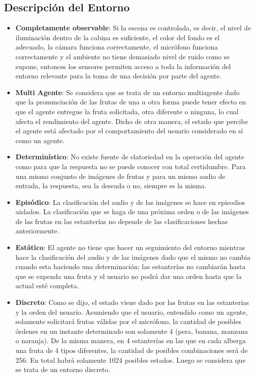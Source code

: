 \documentclass[a4paper, 12pt]{article}
\begin{document}
\subsection{Descripción del Entorno}
\begin{itemize}
\item \textbf{Completamente observable}: Si la escena es controlada, es decir, el nivel de iluminación dentro de la cabina es suficiente, el color del fondo es el adecuado, la cámara funciona correctamente, el micrófono funciona correctamente y el ambiente no tiene demasiado nivel de ruido como se supone, entonces los sensores permiten acceso a toda la información del entorno relevante para la toma de una decisión por parte del agente.
\item \textbf{Multi Agente}: Se considera que se trata de un entorno multiagente dado que la pronunciación de las frutas de una u otra forma puede tener efecto en que el agente entregue la fruta solicitada, otra diferente o ninguna, lo cual afecta el rendimiento del agente. Dicho de otra manera, el estado que percibe el agente está afectado por el comportamiento del usuario considerado en sí como un agente.
\item \textbf{Determinístico}: No existe fuente de elatoriedad en la operación del agente como para que la respuesta no se puede conocer con total certidumbre. Para una mismo conjunto de imágenes de frutas y para un mismo audio de entrada, la respuesta, sea la deseada o no, siempre es la misma.
\item \textbf{Episódico}: La clasificación del audio y de las imágenes se hace en episodios aislados. La clasificación que se haga de una próxima orden o de las imágenes de las frutas en las estanterías no depende de las clasificaciones hechas anteriormente.
\item \textbf{Estático}: El agente no tiene que hacer un seguimiento del entorno mientras hace la clasificación del audio y de las imágenes dado que el mismo no cambia cuando esta haciendo una determinación; las estanterías no cambiarán hasta que se expenda una fruta y el usuario no podrá dar una orden hasta que la actual esté completa.
\item \textbf{Discreto}: Como se dijo, el estado viene dado por las frutas en las estanterías y la orden del usuario. Asumiendo que el usuario, entendido como un agente, solamente solicitará frutas válidas por el micrófono, la cantidad de posibles órdenes en un instante determinado son solamente 4 (pera, banana, manzana o naranja). De la misma manera, en 4 estanterías en las que en cada alberga una fruta de 4 tipos diferentes, la cantidad de posibles combinaciones será de 256. En total habrá solamente 1024 posibles estados. Luego se considera que se trata de un entorno discreto.
\end{itemize}
\end{document}
